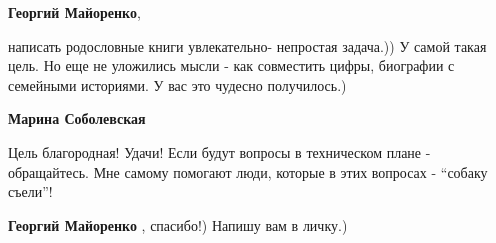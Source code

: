\begin{itemize}
\begin{itemize}
\begin{itemize} %
\textbf{Георгий Майоренко}, 

написать родословные книги увлекательно- непростая задача.)) У самой такая
цель. Но еще не уложились мысли - как совместить цифры, биографии с семейными
историями. У вас это чудесно получилось.)

\textbf{Марина Соболевская} 

Цель благородная! Удачи! Если будут вопросы в техническом плане - обращайтесь.
Мне самому помогают люди, которые в этих вопросах - \enquote{собаку съели}!

\textbf{Георгий Майоренко} , спасибо!) Напишу вам в личку.)
\end{itemize} %

\end{itemize} %

\end{itemize} %
